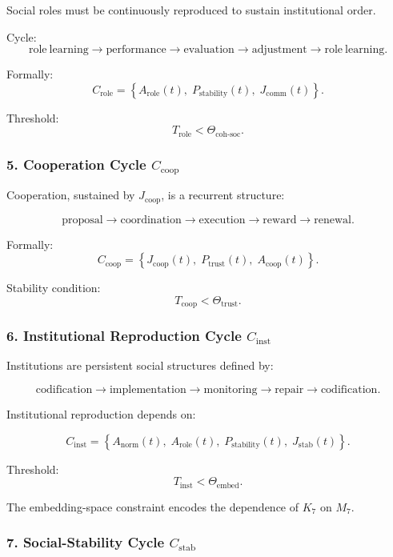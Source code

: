 Social roles must be continuously reproduced to sustain institutional order.

Cycle:
\[
  \mathrm{role\ learning}
  \to
  \mathrm{performance}
  \to
  \mathrm{evaluation}
  \to
  \mathrm{adjustment}
  \to
  \mathrm{role\ learning}.
\]

Formally:
\[
  C_{\mathrm{role}}
  =
  \left\{
     A_{\mathrm{role}}(t),\;
     P_{\mathrm{stability}}(t),\;
     J_{\mathrm{comm}}(t)
  \right\}.
\]

Threshold:
\[
  T_{\mathrm{role}} < \Theta_{\mathrm{coh\text{-}soc}}.
\]

\subsubsection{5. Cooperation Cycle $C_{\mathrm{coop}}$}

Cooperation, sustained by $J_{\mathrm{coop}}$, is a recurrent structure:

\[
 \mathrm{proposal}
 \to
 \mathrm{coordination}
 \to
 \mathrm{execution}
 \to
 \mathrm{reward}
 \to
 \mathrm{renewal}.
\]

Formally:
\[
 C_{\mathrm{coop}}=
 \left\{
   J_{\mathrm{coop}}(t),\;
   P_{\mathrm{trust}}(t),\;
   A_{\mathrm{coop}}(t)
 \right\}.
\]

Stability condition:
\[
 T_{\mathrm{coop}} < \Theta_{\mathrm{trust}}.
\]

\subsubsection{6. Institutional Reproduction Cycle $C_{\mathrm{inst}}$}

Institutions are persistent social structures defined by:

\[
  \mathrm{codification}
  \to
  \mathrm{implementation}
  \to
  \mathrm{monitoring}
  \to
  \mathrm{repair}
  \to
  \mathrm{codification}.
\]

Institutional reproduction depends on:

\[
 C_{\mathrm{inst}}
 =
 \left\{
   A_{\mathrm{norm}}(t),\;
   A_{\mathrm{role}}(t),\;
   P_{\mathrm{stability}}(t),\;
   J_{\mathrm{stab}}(t)
 \right\}.
\]

Threshold:
\[
 T_{\mathrm{inst}} < \Theta_{\mathrm{embed}}.
\]

The embedding-space constraint encodes the dependence of
$K_7$ on $M_7$.

\subsubsection{7. Social-Stability Cycle $C_{\mathrm{stab}}$}


